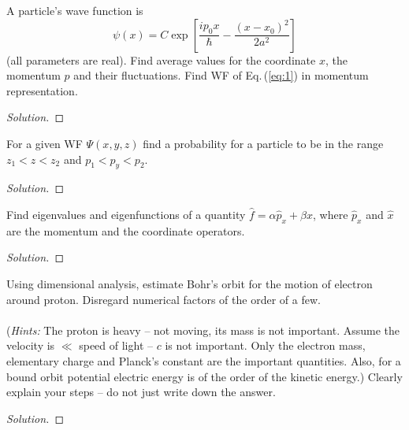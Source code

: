 \begin{problem}
A particle's wave function is
\begin{equation}
\label{eq:1}
\psi(x)=C\exp\left[\frac{ip_0x}{\hbar}-\frac{(x-x_0)^2}{2a^2}\right]
\end{equation}
(all parameters are real). Find average values for the coordinate
$x$, the momentum $p$ and their fluctuations. Find WF of
Eq.\,(\ref{eq:1}) in momentum representation.
\end{problem}
\begin{proof}[Solution]
\end{proof}
\newpage

\begin{problem}
For a given WF $\Psi(x,y,z)$ find a probability for a particle to
be in the range $z_1<z<z_2$ and $p_1<p_y<p_2$.
\end{problem}
\begin{proof}[Solution]
\end{proof}
\newpage

\begin{problem}
Find eigenvalues and eigenfunctions of a quantity $\hat
f=\alpha\hat p_x+\beta\hat x$, where $\hat p_x$ and $\hat x$ are
the momentum and the coordinate operators.
\end{problem}
\begin{proof}[Solution]
\end{proof}
\newpage

\begin{problem}
Using dimensional analysis, estimate Bohr's orbit for the
motion of electron around proton. Disregard numerical factors
of the order of a few.
\\\\
(\emph{Hints:} The proton is heavy -- not moving, its mass is not
important. Assume the velocity is $\ll$ speed of light -- $c$ is
not important. Only the electron mass, elementary charge and
Planck's constant are the important quantities. Also, for a bound
orbit potential electric energy is of the order of the kinetic
energy.) Clearly explain your steps -- do not just write down the
answer.
\end{problem}
\begin{proof}[Solution]
\end{proof}

